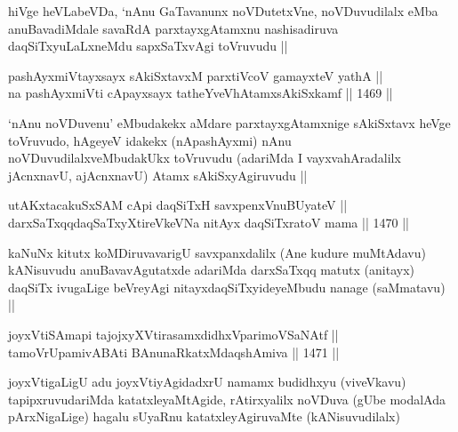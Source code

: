 \begin{artha}
hiVge heVLabeVDa, `nAnu GaTavanunx noVDutetxVne, noVDuvudilalx eMba anuBavadiMdale savaRdA parxtayxgAtamxnu nashisadiruva daqSiTxyuLaLxneMdu sapxSaTxvAgi toVruvudu ||
\end{artha}


\begin{shl}
pashAyxmiVtayxsayx sAkiSxtavxM parxtiVcoV gamayxteV yathA || \\
na pashAyxmiVti cApayxsayx tatheYveVhA\s \s tamxsAkiSxkamf ||  1469 ||  
\end{shl}

\begin{artha}
`nAnu noVDuvenu' eMbudakekx aMdare parxtayxgAtamxnige sAkiSxtavx heVge toVruvudo, hAgeyeV idakekx (nApashAyxmi) nAnu noVDuvudilalxveMbudakUkx toVruvudu (adariMda I vayxvahAradalilx jAcnxnavU, ajAcnxnavU) Atamx sAkiSxyAgiruvudu ||
\end{artha}

\begin{shl}
utAKxtacakuSxSAM cApi daqSiTxH savxpenxV\s nuBUyateV || \\
darxSaTxqqdaqSaTxyXtireVkeVNa nitAyx daqSiTxratoV mama ||  1470 ||  
\end{shl}

\begin{artha}
kaNuNx kitutx koMDiruvavarigU savxpanxdalilx (Ane kudure muMtAdavu) kANisuvudu anuBavavAgutatxde adariMda darxSaTxqq matutx (anitayx) daqSiTx ivugaLige beVreyAgi nitayxdaqSiTxyideyeMbudu nanage (saMmatavu) ||
\end{artha}


\begin{shl}
joyxVtiSAmapi tajojxyXVtirasamxdidhxVparimoVSaNAtf || \\
tamoVrUpamivA\s \s BAti BAnunaRkatxMdaqshAmiva ||  1471 ||  
\end{shl}

\begin{artha}
joyxVtigaLigU adu joyxVtiyAgidadxrU namamx budidhxyu (viveVkavu) tapipxruvudariMda katatxleyaMtAgide, rAtirxyalilx noVDuva (gUbe modalAda pArxNigaLige) hagalu sUyaRnu katatxleyAgiruvaMte (kANisuvudilalx)
\end{artha}


